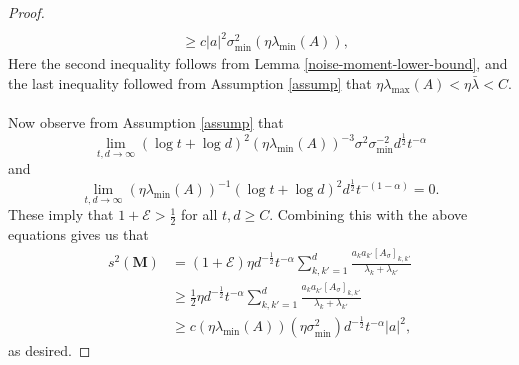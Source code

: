 \documentclass[11pt, reqno,english]{amsart}
\begin{document}
\begin{proof}
\begin{align*}
\\
&\geq c|a|^2 \sigma^2_{\min}(\eta \lambda_{\min}(A)),
\end{align*} 
Here the second inequality follows from Lemma \ref{noise-moment-lower-bound}, and the last inequality followed from Assumption \ref{assump} that $\eta \lambda_{\max}(A) < \eta \bar{\lambda} < C$.  
\\\\
Now observe from Assumption \ref{assump} that $$\lim\limits_{t,d \to \infty}(\log t + \log d)^2 (\eta \lambda_{\min}(A))^{-3} \sigma^2 \sigma^{-2}_{\min}d^{\frac{1}{2}}t^{-\alpha}$$ and
$$\lim\limits_{t,d \to \infty} (\eta \lambda_{\min}(A))^{-1}(\log t + \log d)^2 d^{\frac{1}{2}}t^{-(1 - \alpha)} = 0.$$
These imply that $1 + \mathcal E > \frac{1}{2}$ for all $t,d \geq C$. Combining this with the above equations gives us that
\begin{align*}
s^2(\mathbf{M}) &= (1+\mathcal E)\eta d^{-\frac{1}{2}}t^{-\alpha}\sum_{k,k' = 1}^d \frac{a_k a_{k'}[A_{\sigma}]_{k,k'}}{\lambda_{k} + \lambda_{k'}}
\\
&\geq \frac{1}{2}\eta d^{-\frac{1}{2}}t^{-\alpha}\sum_{k,k' = 1}^d \frac{a_k a_{k'}[A_{\sigma}]_{k,k'}}{\lambda_{k} + \lambda_{k'}}
\\
&\geq c(\eta \lambda_{\min}(A))(\eta \sigma^2_{\min})d^{-\frac{1}{2}}t^{-\alpha}|a|^2,
\end{align*}
as desired.
\end{proof}
\end{document}
